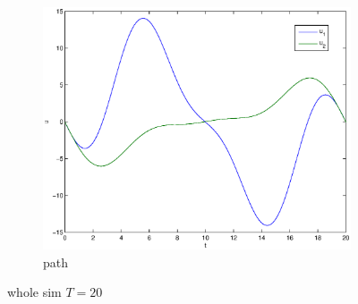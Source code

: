 \begin{figure}
\begin{subfigure}[b]{\textwidth}
\centering
\includegraphics[height=0.3\textheight]{img/final_1_15_20_u.eps}
\caption{path}
\end{subfigure}
\caption{whole sim $T=20$}
\end{figure}


